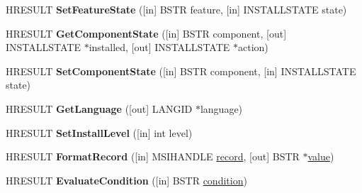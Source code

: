 \begin{DoxyCompactItemize}
\item 
\mbox{\label{interface_i_wine_msi_remote_package_ac9158b03d06461bfd86c287ae029cc6a}} 
H\+R\+E\+S\+U\+LT {\bfseries Set\+Feature\+State} (\mbox{[}in\mbox{]} B\+S\+TR feature, \mbox{[}in\mbox{]} I\+N\+S\+T\+A\+L\+L\+S\+T\+A\+TE state)
\item 
\mbox{\label{interface_i_wine_msi_remote_package_af7fe9fe2999d1ec9f45a6c527d4ef31f}} 
H\+R\+E\+S\+U\+LT {\bfseries Get\+Component\+State} (\mbox{[}in\mbox{]} B\+S\+TR component, \mbox{[}out\mbox{]} I\+N\+S\+T\+A\+L\+L\+S\+T\+A\+TE $\ast$installed, \mbox{[}out\mbox{]} I\+N\+S\+T\+A\+L\+L\+S\+T\+A\+TE $\ast$action)
\item 
\mbox{\label{interface_i_wine_msi_remote_package_a2900414386b350245f214b742d300ee5}} 
H\+R\+E\+S\+U\+LT {\bfseries Set\+Component\+State} (\mbox{[}in\mbox{]} B\+S\+TR component, \mbox{[}in\mbox{]} I\+N\+S\+T\+A\+L\+L\+S\+T\+A\+TE state)
\item 
\mbox{\label{interface_i_wine_msi_remote_package_a0276be91210dca80b167028b6629ad86}} 
H\+R\+E\+S\+U\+LT {\bfseries Get\+Language} (\mbox{[}out\mbox{]} L\+A\+N\+G\+ID $\ast$language)
\item 
\mbox{\label{interface_i_wine_msi_remote_package_a01fa99b3332cc45f1e16fda771fed86a}} 
H\+R\+E\+S\+U\+LT {\bfseries Set\+Install\+Level} (\mbox{[}in\mbox{]} int level)
\item 
\mbox{\label{interface_i_wine_msi_remote_package_aee7b6442d3b5153e9ee751aff8de5fca}} 
H\+R\+E\+S\+U\+LT {\bfseries Format\+Record} (\mbox{[}in\mbox{]} M\+S\+I\+H\+A\+N\+D\+LE \hyperlink{structrecord}{record}, \mbox{[}out\mbox{]} B\+S\+TR $\ast$\hyperlink{unionvalue}{value})
\item 
\mbox{\label{interface_i_wine_msi_remote_package_a2f94ba97f79b5a0439bd461dc4432a43}} 
H\+R\+E\+S\+U\+LT {\bfseries Evaluate\+Condition} (\mbox{[}in\mbox{]} B\+S\+TR \hyperlink{interfacevoid}{condition})
\item 
\mbox{\label{interface_i_wine_msi_remote_package_af552b05225e37fbd8f42644591eb32ba}} 

\end{DoxyCompactItemize}
